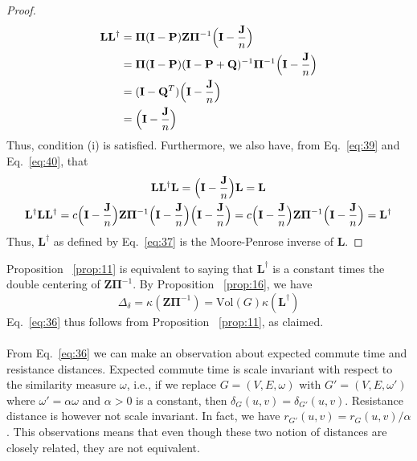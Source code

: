 \begin{proof}
\begin{equation}
    \label{eq:40}
    \begin{split}
      \mathbf{L}\mathbf{L}^{\dagger} &= \bm{\Pi}(\mathbf{I} - \mathbf{P}) \mathbf{Z}
      \bm{\Pi}^{-1} \Bigl(\mathbf{I} - \frac{\mathbf{J}}{n}\Bigr) \\
      &= \bm{\Pi}(\mathbf{I} - \mathbf{P}) (\mathbf{I} - \mathbf{P} + \mathbf{Q})^{-1}
      \bm{\Pi}^{-1} \Bigl(\mathbf{I} - \frac{\mathbf{J}}{n}\Bigr) \\
      &= (\mathbf{I} - \mathbf{Q}^{T})\Bigl(\mathbf{I} - \frac{\mathbf{J}}{n}\Bigr) \\
      &= \Bigl(\mathbf{I} - \frac{\mathbf{J}}{n}\Bigr)
   \end{split}
  \end{equation}
  Thus, condition (i) is satisfied. Furthermore, we also have, from
  Eq.~\eqref{eq:39} and Eq.~\eqref{eq:40}, that
  \begin{gather*}
   \mathbf{L}\mathbf{L}^{\dagger}\mathbf{L} = \Bigl(\mathbf{I} -
   \frac{\mathbf{J}}{n}\Bigr) \mathbf{L}
   = \mathbf{L} \\
    \mathbf{L}^{\dagger}\mathbf{L}\mathbf{L}^{\dagger} = c \Bigl(\mathbf{I} -
    \frac{\mathbf{J}}{n}\Bigr) \mathbf{Z}
     \bm{\Pi}^{-1} \Bigl(\mathbf{I} - \frac{\mathbf{J}}{n}\Bigr) \Bigl(\mathbf{I} -
     \frac{\mathbf{J}}{n}\Bigr) = c \Bigl(\mathbf{I} - \frac{\mathbf{J}}{n}\Bigr) \mathbf{Z}
     \bm{\Pi}^{-1} \Bigl(\mathbf{I} - \frac{\mathbf{J}}{n}\Bigr) = \mathbf{L}^{\dagger}
  \end{gather*}
  Thus, $\mathbf{L}^{\dagger}$ as defined by Eq.~\eqref{eq:37} is the
  Moore-Penrose inverse of $\mathbf{L}$. 
\end{proof}
Proposition ~\ref{prop:11} is equivalent to saying that
$\mathbf{L}^{\dagger}$ is a constant times the double centering of
$\mathbf{Z}\bm{\Pi}^{-1}$. By Proposition ~\ref{prop:16}, we have 
\begin{equation}
  \label{eq:42}
 \Delta_{\delta} = \kappa(\mathbf{Z}\bm{\Pi}^{-1}) = \mathrm{Vol}(G)
\kappa(\mathbf{L}^{\dagger}) 
\end{equation}
Eq.~\eqref{eq:36} thus follows from Proposition ~\ref{prop:11}, as
claimed. \\
\\
\noindent
From Eq.~\eqref{eq:36} we can make an observation about expected
commute time and resistance distances. Expected commute time is scale
invariant with respect to the similarity measure $\omega$, i.e., if we
replace $G = (V,E,\omega)$ with $G' = (V,E,\omega')$ where $\omega' =
\alpha \omega$ and $\alpha > 0$ is a constant, then $\delta_{G}(u,v) =
\delta_{G'}(u,v)$. Resistance distance is however not scale
invariant. In fact, we have $r_{G'}(u,v) = r_{G}(u,v)/\alpha$. This
observations means that even though these two notion of distances
are closely related, they are not equivalent.
%
